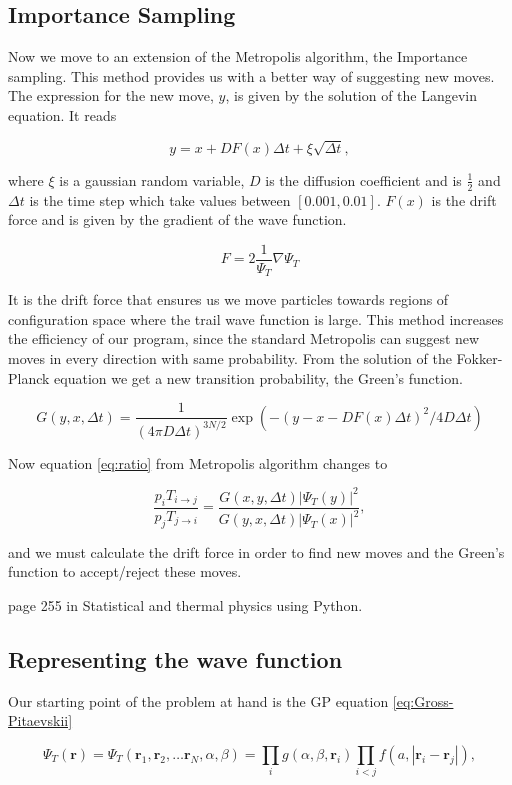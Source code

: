\subsection{Importance Sampling}

Now we move to an extension of the Metropolis algorithm, the Importance sampling. This method provides us with a better way of suggesting new moves. The expression for the new move, $y$, is given by the solution of the Langevin equation. It reads 

$$y = x + D F(x) \Delta t + \xi \sqrt{\Delta t},$$

where $\xi$ is a gaussian random variable, $D$ is the diffusion coefficient and is $\frac{1}{2}$ and $\Delta t$ is the time step which take values between $[0.001, 0.01]$.
$F(x)$ is the drift force and is given by the gradient of the wave function. 

$$F = 2 \frac{1}{\Psi_T} \nabla \Psi_T$$

It is the drift force that ensures us we move particles towards regions of configuration space where the trail wave function is large. This method increases the efficiency of our program, since the standard Metropolis can suggest new moves in every direction with same probability. 
From the solution of the Fokker-Planck equation we get a new transition probability, the Green's function. 

$$G(y, x, \Delta t) = \frac{1}{(4 \pi D \Delta t)^{3N/2}} \exp (-(y - x - D F(x) \Delta t)^2/4 D \Delta t)$$

Now equation \ref{eq:ratio} from Metropolis algorithm changes to 

$$\frac{p_i T_{i \rightarrow j}}{p_j T_{j \rightarrow i}} = \frac{G(x, y, \Delta t)|\Psi_T(y)|^2}{G(y, x, \Delta t)|\Psi_T(x)|^2},$$

and we must calculate the drift force in order to find new moves and the Green's function to accept/reject these moves.

page 255 in Statistical and thermal physics using Python.

\subsection{Representing the wave function}

Our starting point of the problem at hand is the GP equation \ref{eq:Gross-Pitaevskii}

\begin{equation} \label{eq:trialwf}
 \Psi_T(\mathbf{r})=\Psi_T(\mathbf{r}_1, \mathbf{r}_2, \dots \mathbf{r}_N,\alpha,\beta)=\prod_i g(\alpha,\beta,\mathbf{r}_i)\prod_{i < j}f(a,|\mathbf{r}_i-\mathbf{r}_j|),
\end{equation}

